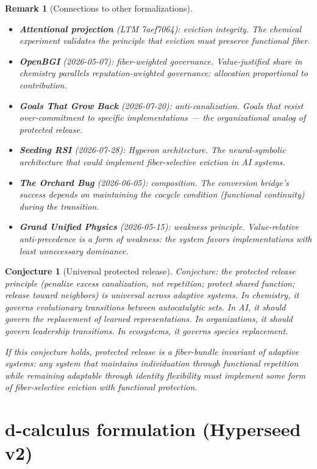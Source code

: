 \documentclass[11pt,a4paper]{article}
\newtheorem{remark}[definition]{Remark}
\newtheorem{conjecture}[definition]{Conjecture}
\begin{document}
\begin{remark}[Connections to other formalizations]
\begin{itemize}
\item \textbf{Attentional projection} (LTM 7aef7064): eviction
  integrity. The chemical experiment validates the principle that
  eviction must preserve functional fiber.
\item \textbf{OpenBGI} (2026-05-07): fiber-weighted governance.
  Value-justified share in chemistry parallels reputation-weighted
  governance: allocation proportional to contribution.
\item \textbf{Goals That Grow Back} (2026-07-20): anti-canalization.
  Goals that resist over-commitment to specific implementations
  --- the organizational analog of protected release.
\item \textbf{Seeding RSI} (2026-07-28): Hyperon architecture.
  The neural-symbolic architecture that could implement
  fiber-selective eviction in AI systems.
\item \textbf{The Orchard Bug} (2026-06-05): composition.
  The conversion bridge's success depends on maintaining
  the cocycle condition (functional continuity) during
  the transition.
\item \textbf{Grand Unified Physics} (2026-05-15): weakness
  principle. Value-relative anti-precedence is a form of
  weakness: the system favors implementations with least
  unnecessary dominance.
\end{itemize}
\end{remark}

\begin{conjecture}[Universal protected release]
Conjecture: the protected release principle (penalize excess
canalization, not repetition; protect shared function; release
toward neighbors) is universal across adaptive systems. In
chemistry, it governs evolutionary transitions between
autocatalytic sets. In AI, it should govern the replacement of
learned representations. In organizations, it should govern
leadership transitions. In ecosystems, it governs species
replacement.

If this conjecture holds, protected release is a fiber-bundle
invariant of adaptive systems: any system that maintains
individuation through functional repetition while remaining
adaptable through identity flexibility must implement some
form of fiber-selective eviction with functional protection.
\end{conjecture}

\section{d-calculus formulation (Hyperseed v2)}
\end{document}
